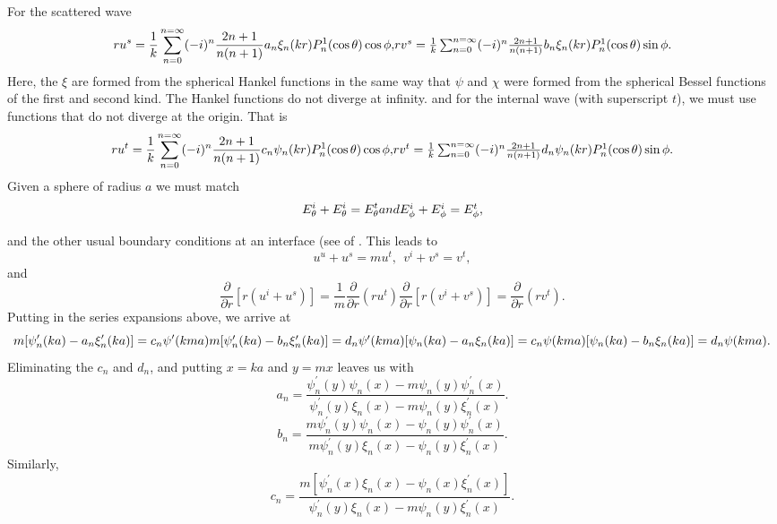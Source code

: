 \documentclass[12pt]{article}
\begin{document}
For the scattered wave
\begin{equation}
ru^s= \frac{1}{k} \sum_{n=0}^{n=\infty} (-i)^n
\frac{ 2n+1}{n(n+1)} a_n \xi_n (k r) P^1_n(\cos \theta) \cos \phi,
$$    $$
rv^s= \frac{1}{k} \sum_{n=0}^{n=\infty} (-i)^n
\frac{ 2n+1}{n(n+1)} b_n \xi_n (k r) P^1_n(\cos \theta) \sin \phi.
\end{equation}
Here, the $\xi$  are formed from the spherical Hankel functions in the same 
way that $\psi$ and $\chi$ were formed from the spherical Bessel functions
of the first and second kind.  The  Hankel functions do not diverge at infinity. and for the internal wave (with superscript $t$), we must use functions that do not diverge at the origin. That is
\begin{equation}
ru^t= \frac{1}{k} \sum_{n=0}^{n=\infty} (-i)^n
\frac{ 2n+1}{n(n+1)} c_n \psi_n (k r) P^1_n(\cos \theta) \cos \phi,
$$    $$
rv^t= \frac{1}{k} \sum_{n=0}^{n=\infty} (-i)^n
\frac{ 2n+1}{n(n+1)} d_n \psi_n (k r) P^1_n(\cos \theta) \sin \phi.
\end{equation}
Given a sphere of radius $a$ we must match
\begin{equation}
E^i_\theta +E^i_\theta=E^t_\theta
$$ and   $$
E^i_\phi +E^i_\phi=E^t_\phi,
\end{equation}

and the other usual boundary conditions at an interface (see  of \cite{FeynLect:Miebib}. This leads to
\begin{equation}
u^u+u^s=mu^t, \> \> v^i+v^s=v^t,
\end{equation}
and 
\begin{equation}
\frac{\partial}{\partial r}[r (u^i+u^s)]
 =\frac{1}{m} \frac{\partial}{\partial r} (r u^t)
\frac{\partial}{\partial r}[r (v^i+v^s)]
 =\frac{\partial}{\partial r} (r v^t).
\end{equation}
Putting in the series expansions above, we arrive at
\begin{equation}
m[\psi^\prime_n(ka)-a_n \xi^\prime_n(ka)]=c_n \psi^\prime(kma)
$$   $$
m[\psi^\prime_n(ka)-b_n \xi^\prime_n(ka)]=d_n \psi^\prime(kma)
$$   $$
[\psi_n(ka)-a_n \xi_n(ka)]=c_n \psi(kma)
$$   $$
[\psi_n(ka)-b_n \xi_n(ka)]=d_n \psi(kma).
\end{equation}
Eliminating the $c_n$ and $d_n$, and putting $x=ka$ and $y=mx$ leaves us with
\begin{equation}
a_n=\frac{\psi^\prime_n(y)\psi_n(x)-m \psi_n(y) \psi^\prime_n(x)}{
   \psi^\prime_n(y) \xi_n(x)-m \psi_n(y) \xi^\prime_n(x)}.
\end{equation}
\begin{equation}
b_n=\frac{m \psi^\prime_n(y)\psi_n(x)- \psi_n(y) \psi^\prime_n(x)}{
  m \psi^\prime_n(y) \xi_n(x)- \psi_n(y) \xi^\prime_n(x)}.
\end{equation}
Similarly,
\begin{equation}
c_n=\frac{ m[\psi^\prime_n(x)\xi_n(x)- \psi_n(x) \xi^\prime_n(x)]}{
   \psi^\prime_n(y) \xi_n(x)-m \psi_n(y) \xi^\prime_n(x)}.
\end{equation}
\end{document}
